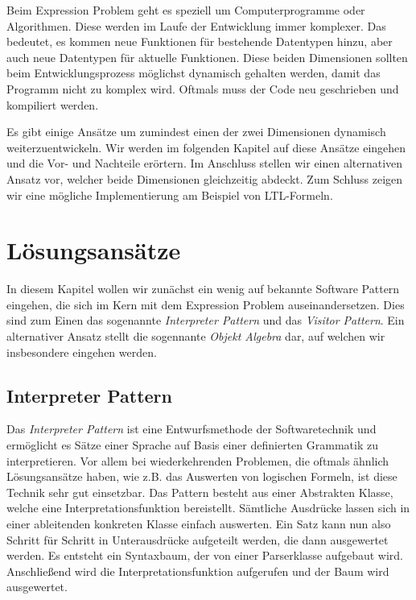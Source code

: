 \documentclass{llncs}
\begin{document}
Beim Expression Problem geht es speziell um Computerprogramme oder Algorithmen. Diese werden im Laufe der Entwicklung immer komplexer. Das bedeutet, es kommen neue Funktionen für bestehende Datentypen hinzu, aber auch neue Datentypen für aktuelle Funktionen. Diese beiden Dimensionen sollten beim Entwicklungsprozess möglichst dynamisch gehalten werden, damit das Programm nicht zu komplex wird. Oftmals muss der Code neu geschrieben und kompiliert werden. 
\cite{wadler98}

Es gibt einige Ansätze um zumindest einen der zwei Dimensionen dynamisch weiterzuentwickeln. Wir werden im folgenden Kapitel auf diese Ansätze eingehen und die Vor- und Nachteile erörtern. Im Anschluss stellen wir einen alternativen Ansatz vor, welcher beide Dimensionen gleichzeitig abdeckt. Zum Schluss zeigen wir eine mögliche Implementierung am Beispiel von LTL-Formeln.   

\section{Lösungsansätze} \label{sec:approaches}

In diesem Kapitel wollen wir zunächst ein wenig auf bekannte Software Pattern eingehen, die sich im Kern mit dem Expression Problem auseinandersetzen. Dies sind zum Einen das sogenannte \emph{Interpreter Pattern} und das \emph{Visitor Pattern}. Ein alternativer Ansatz stellt die sogennante \emph{Objekt Algebra} dar, auf welchen wir insbesondere eingehen werden. 

\subsection{Interpreter Pattern} \label{sec:interpreter}

Das \emph{Interpreter Pattern} ist eine Entwurfsmethode der Softwaretechnik und ermöglicht es Sätze einer Sprache auf Basis einer definierten Grammatik zu interpretieren. Vor allem bei wiederkehrenden Problemen, die oftmals ähnlich Lösungsansätze haben, wie z.B. das Auswerten von logischen Formeln, ist diese Technik sehr gut einsetzbar. Das Pattern besteht aus einer Abstrakten Klasse, welche eine Interpretationsfunktion bereistellt. Sämtliche Ausdrücke lassen sich in einer ableitenden konkreten Klasse einfach auswerten. Ein Satz kann nun also Schritt für Schritt in Unterausdrücke aufgeteilt werden, die dann ausgewertet werden. Es entsteht ein Syntaxbaum, der von einer Parserklasse aufgebaut wird. Anschließend wird die Interpretationsfunktion aufgerufen und der Baum wird ausgewertet. 
\end{document}
